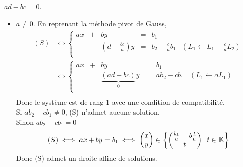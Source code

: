 \documentclass{article}
\begin{document}
\begin{question_kholle}
  \item $ad - bc = 0$.
  \begin{itemize}[label=$\bullet$ Supposons]
    \item $a \neq 0$. En reprenant la méthode pivot de Gauss,
          \begin{equation*}
            \begin{aligned}
              (S)
               & \iff \left\{
              \begin{array}{cccccc}
                ax & + & by                             & = & b_1                                                            \\
                   &   & \left(d - \frac{bc}{a}\right)y & = & b_2 - \frac{c}{a} b_1 & (L_1 \leftarrow L_1 - \frac{c}{a} L_2) \\
              \end{array}
              \right.         \\
               & \iff \left\{
              \begin{array}{cccccc}
                ax & + & by                                    & = & b_1                                   \\
                   &   & \underbrace{\left(ad - bc\right)}_0 y & = & a b_2 - c b_1 & (L_1 \leftarrow aL_1) \\
              \end{array}
              \right.         \\
            \end{aligned}
          \end{equation*}
          Donc le système est de rang 1 avec une condition de compatibilité. \\
          Si $ab_2 - cb_1 \neq 0$, (S) n'admet aucune solution. \\
          Sinon $ab_2 - cb_1 = 0$
          \begin{equation}
            (S) \iff
            ax + by = b_1 \iff
            \begin{pmatrix} x \\ y \end{pmatrix} \in \left\{
            \begin{pmatrix} \frac{b_1}{a} - b\frac{t}{a} \\ t \end{pmatrix}
            |\; t \in \mathbb K
            \right\}
          \end{equation}
          Donc (S) admet un droite affine de solutions.


\end{itemize}
\end{question_kholle}
\end{document}
